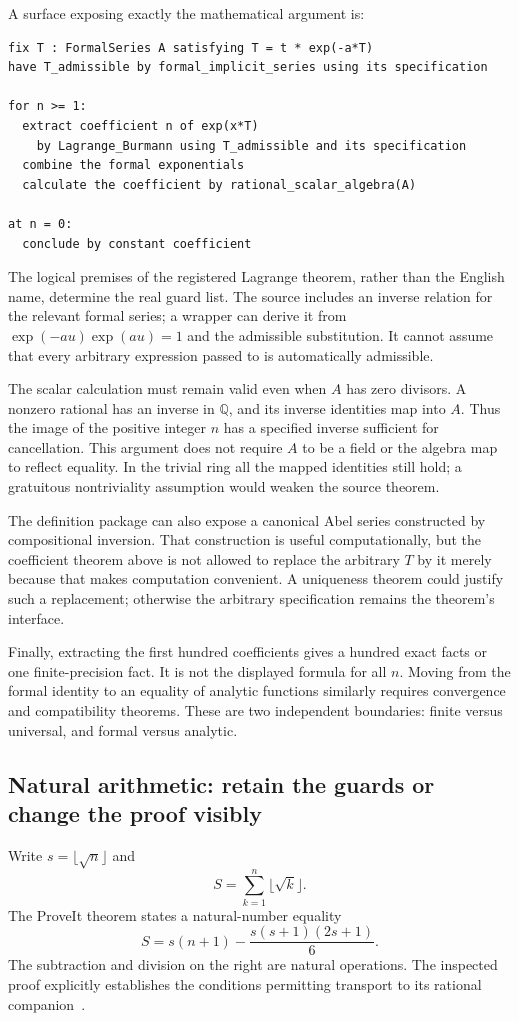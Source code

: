 \documentclass[11pt,a4paper]{article}
\newcommand{\code}[1]{\texttt{\detokenize{#1}}}
\newcommand{\Q}{\mathbb Q}\newcommand{\R}{\mathbb R}
\theoremstyle{remark}\newtheorem{example}[proposition]{Example}
\begin{document}
A surface exposing exactly the mathematical argument is:
\begin{lstlisting}
fix T : FormalSeries A satisfying T = t * exp(-a*T)
have T_admissible by formal_implicit_series using its specification

for n >= 1:
  extract coefficient n of exp(x*T)
    by Lagrange_Burmann using T_admissible and its specification
  combine the formal exponentials
  calculate the coefficient by rational_scalar_algebra(A)

at n = 0:
  conclude by constant coefficient
\end{lstlisting}
The logical premises of the registered Lagrange theorem, rather than the English name, determine the real guard list. The source includes an inverse relation for the relevant formal series; a wrapper can derive it from $\exp(-au)\exp(au)=1$ and the admissible substitution. It cannot assume that every arbitrary expression passed to \code{subst} is automatically admissible.

The scalar calculation must remain valid even when $A$ has zero divisors. A nonzero rational has an inverse in $\Q$, and its inverse identities map into $A$. Thus the image of the positive integer $n$ has a specified inverse sufficient for cancellation. This argument does not require $A$ to be a field or the algebra map to reflect equality. In the trivial ring all the mapped identities still hold; a gratuitous nontriviality assumption would weaken the source theorem.

The definition package can also expose a canonical Abel series constructed by compositional inversion. That construction is useful computationally, but the coefficient theorem above is not allowed to replace the arbitrary $T$ by it merely because that makes computation convenient. A uniqueness theorem could justify such a replacement; otherwise the arbitrary specification remains the theorem's interface.

Finally, extracting the first hundred coefficients gives a hundred exact facts or one finite-precision fact. It is not the displayed formula for all $n$. Moving from the formal identity to an equality of analytic functions similarly requires convergence and compatibility theorems. These are two independent boundaries: finite versus universal, and formal versus analytic.

\subsection{Natural arithmetic: retain the guards or change the proof visibly}\label{sec:sqrtcase}
Write $s=\lfloor\sqrt n\rfloor$ and
\[
 S=\sum_{k=1}^{n}\lfloor\sqrt k\rfloor.
\]
The ProveIt theorem states a natural-number equality
\[
 S=s(n+1)-\frac{s(s+1)(2s+1)}6.
\]
The subtraction and division on the right are natural operations. The inspected proof explicitly establishes the conditions permitting transport to its rational companion~\cite{sqrt}.
\end{document}
